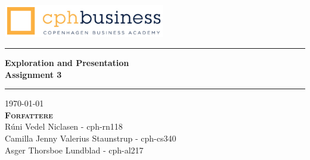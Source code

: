 
\begin{titlepage}
\begin{center}

\vspace*{4cm}
\includegraphics[width=7cm]{./figures/cphlogo.png}
\vspace*{2cm}

\hrule
\vspace{.5cm}
{ \huge \bfseries Exploration and Presentation\\Assignment 3} 
\vspace{.5cm}
\hrule

\vspace{1cm}
\centering \today\\
\vspace{0.5cm}
\textsc{\textbf{Forfattere}}\\

\centering
Rúni Vedel Niclasen - cph-rn118\\
Camilla Jenny Valerius Staunstrup - cph-cs340\\
Asger Thorsboe Lundblad - cph-al217\\

\vspace{10cm}


\end{center}
\end{titlepage}